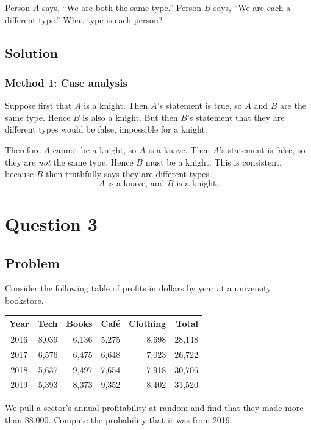 \documentclass[12pt]{article}
\begin{document}
Person $A$ says, ``We are both the same type.'' Person $B$ says, ``We are each a different type.'' What type is each person?

\subsection{Solution}
\subsubsection{Method 1: Case analysis}
Suppose first that $A$ is a knight. Then $A$'s statement is true, so $A$ and $B$ are the same type. Hence $B$ is also a knight. But then $B$'s statement that they are different types would be false, impossible for a knight.

Therefore $A$ cannot be a knight, so $A$ is a knave. Then $A$'s statement is false, so they are \emph{not} the same type. Hence $B$ must be a knight. This is consistent, because $B$ then truthfully says they are different types.
\[
\boxed{A\text{ is a knave, and }B\text{ is a knight.}}
\]

\section{Question 3}
\subsection{Problem}
Consider the following table of profits in dollars by year at a university bookstore.

\begin{center}
\begin{tabular}{crrrrr}
\toprule
Year & Tech & Books & Caf\'e & Clothing & Total \\
\midrule
2016 & 8{,}039 & 6{,}136 & 5{,}275 & 8{,}698 & 28{,}148 \\
2017 & 6{,}576 & 6{,}475 & 6{,}648 & 7{,}023 & 26{,}722 \\
2018 & 5{,}637 & 9{,}497 & 7{,}654 & 7{,}918 & 30{,}706 \\
2019 & 5{,}393 & 8{,}373 & 9{,}352 & 8{,}402 & 31{,}520 \\
\bottomrule
\end{tabular}
\end{center}

We pull a sector's annual profitability at random and find that they made more than \$8{,}000. Compute the probability that it was from 2019.
\end{document}
